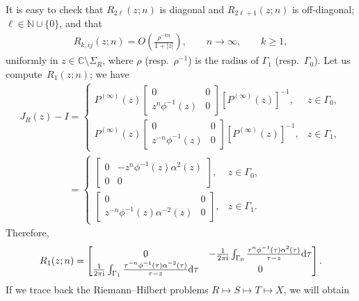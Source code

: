 \documentclass[pdftex]{sigma}
\numberwithin{equation}{section}
\newcommand{\C}{{\mathbb C}}
\newcommand{\N}{{\mathbb N}}
\newcommand{\al}{\alpha}
\newcommand{\Ga}{\Gamma}
\begin{document}
		It is easy to check that $R_{2\ell}(z;n)$ is diagonal and $R_{2\ell+1}(z;n)$ is off-diagonal; $\ell \in \N \cup \{0\}$, and that
		\begin{gather}\label{R_k's are small}
			R_{k,ij}(z;n) = O \left( \frac{\rho^{-kn}}{1+|z|} \right), \qquad n \to \infty, \qquad k \geq 1,
		\end{gather}
		uniformly in $z\in \C \setminus \Sigma_R$, where $\rho$ \big(resp.\ $\rho^{-1}$\big) is the radius of $\Ga_1$ (resp.\ $\Ga_0$). Let us compute~${R_1(z;n)}$; we have
		\begin{gather*}\label{JR-I}
			J_R(z)-I = \begin{cases}
	P^{(\infty)}(z) \begin{bmatrix}
					0 & 0 \\
					z^n \phi^{-1}(z) & 0 \end{bmatrix} \left[ P^{(\infty)}(z) \right]^{-1}, & z \in \Ga_0, \\[14pt]
			 	P^{(\infty)}(z) \begin{bmatrix}
					0 & 0 \\
					z^{-n} \phi^{-1}(z) & 0 \end{bmatrix} \left[ P^{(\infty)}(z) \right]^{-1}, & z \in \Ga_1,
			\end{cases} \\
\phantom{J_R(z)-I }{} = \begin{cases}
				\begin{bmatrix}
					0 & -z^{n} \phi^{-1}(z)\al^{2}(z) \\
					0 & 0 \end{bmatrix}, & z \in \Ga_0, \\[14pt]
 				\begin{bmatrix}
					0 & 0 \\
					z^{-n} \phi^{-1}(z)\al^{-2}(z) & 0 \end{bmatrix}, & z \in \Ga_1.
			\end{cases}
		\end{gather*}
		Therefore,
		\begin{gather}\label{R1}
			R_1(z;n)= \begin{bmatrix}
				0 & -\tfrac{1}{2\pi {\rm i}}\int_{\Ga_0} \tfrac{\tau^{n} \phi^{-1}(\tau)\al^{2}(\tau)}{\tau-z}{\rm d}\tau \\
 \frac{1}{2\pi {\rm i}}\int_{\Ga_1} \tfrac{\tau^{-n} \phi^{-1}(\tau)\al^{-2}(\tau)}{\tau-z}{\rm d}\tau
				& 0 \end{bmatrix}.
		\end{gather}
		If we trace back the Riemann--Hilbert problems $R \mapsto S \mapsto T \mapsto X $, we will obtain
\end{document}
